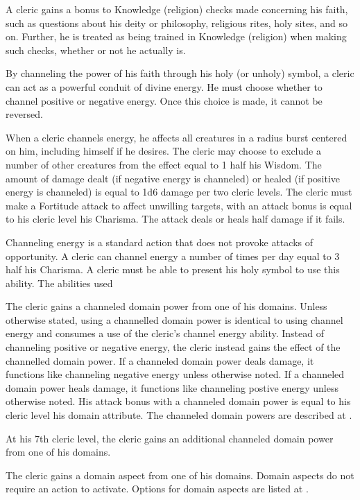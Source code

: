 A cleric gains a  bonus to Knowledge (religion) checks made concerning his faith, such as questions about his deity or philosophy, religious rites, holy sites, and so on. Further, he is treated as being trained in Knowledge (religion) when making such checks, whether or not he actually is.

 By channeling the power of his faith through his holy (or unholy) symbol, a cleric can act as a powerful conduit of divine energy. He must choose whether to channel positive or negative energy. Once this choice is made, it cannot be reversed.

When a cleric channels energy, he affects all creatures in a \areamed radius burst centered on him, including himself if he desires. The cleric may choose to exclude a number of other creatures from the effect equal to 1 \add half his Wisdom. The amount of damage dealt (if negative energy is channeled) or healed (if positive energy is channeled) is equal to 1d6 damage per two cleric levels. The cleric must make a Fortitude attack to affect unwilling targets, with an attack bonus is equal to his cleric level \add his Charisma. The attack deals or heals half damage if it fails.

Channeling energy is a standard action that does not provoke attacks of opportunity. A cleric can channel energy a number of times per day equal to 3 \add half his Charisma. A cleric must be able to present his holy symbol to use this ability. The abilities used 

 The cleric gains a channeled domain power from one of his domains. Unless otherwise stated, using a channelled domain power is identical to using channel energy and consumes a use of the cleric's channel energy ability. Instead of channeling positive or negative energy, the cleric instead gains the effect of the channelled domain power. If a channeled domain power deals damage, it functions like channeling negative energy unless otherwise noted. If a channeled domain power heals damage, it functions like channeling postive energy unless otherwise noted. His attack bonus with a channeled domain power is equal to his cleric level \add his domain attribute. The channeled domain powers are described at .

At his 7th cleric level, the cleric gains an additional channeled domain power from one of his domains.

 The cleric gains a domain aspect from one of his domains. Domain aspects do not require an action to activate. Options for domain aspects are listed at .

